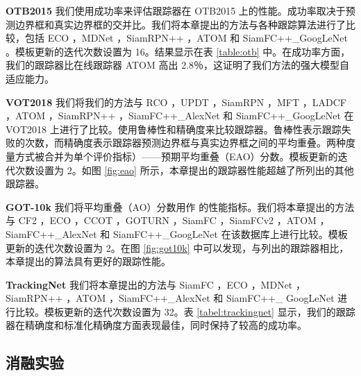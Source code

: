 \textbf{OTB2015} 我们使用成功率来评估跟踪器在 OTB2015 上的性能。成功率取决于预测边界框和真实边界框的交并比。我们将本章提出的方法与各种跟踪算法进行了比较，包括 ECO \cite{danelljan2017eco}，MDNet \cite{MDNet}，SiamRPN++ \cite{SiamRPN++}，ATOM \cite{danelljan2019atom} 和 SiamFC++\_GoogLeNet \cite{SiamFC++}。模板更新的迭代次数设置为 16。结果显示在表 \ref{table:otb} 中。在成功率方面，我们的跟踪器比在线跟踪器 ATOM 高出 2.8％，这证明了我们方法的强大模型自适应能力。

\textbf{VOT2018} 我们将我们的方法与 RCO \cite{kristan2018sixth}，UPDT \cite{bhat2018unveiling}，SiamRPN \cite{SiamRPN}，MFT \cite{kristan2018sixth}，LADCF \cite{kristan2018sixth}，ATOM \cite{danelljan2019atom}，SiamRPN++ \cite{SiamRPN++}，SiamFC++\_AlexNet \cite{SiamFC++} 和 SiamFC++\_GoogLeNet \cite{SiamFC++} 在 VOT2018 上进行了比较。使用鲁棒性和精确度来比较跟踪器。鲁棒性表示跟踪失败的次数，而精确度表示跟踪器预测边界框与真实边界框之间的平均重叠。两种度量方式被合并为单个评价指标）——预期平均重叠（EAO）分数。模板更新的迭代次数设置为 2。如图 \ref{fig:eao} 所示，本章提出的跟踪器性能超越了所列出的其他跟踪器。

\textbf{GOT-10k} 我们将平均重叠（AO）分数用作 \cite{GOT-10k} 的性能指标。我们将本章提出的方法与 CF2 \cite{CF2}，ECO \cite{danelljan2017eco}，CCOT \cite{CCOT}，GOTURN \cite{GOTURN}，SiamFC \cite{SiamFC}，SiamFCv2 \cite{valmadre2017end}，ATOM \cite{danelljan2019atom}，SiamFC++\_AlexNet \cite{SiamFC++} 和 SiamFC++\_GoogLeNet \cite{SiamFC++} 在该数据库上进行比较。模板更新的迭代次数设置为 2。在图 \ref{fig:got10k} 中可以发现，与列出的跟踪器相比，本章提出的算法具有更好的跟踪性能。

\textbf{TrackingNet} 我们将本章提出的方法与 SiamFC \cite{SiamFC}，ECO \cite{danelljan2017eco}，MDNet \cite{MDNet}，SiamRPN++ \cite{SiamRPN++}，ATOM \cite{danelljan2019atom}，SiamFC++\_AlexNet \cite{SiamFC++} 和 SiamFC++\_
GoogLeNet \cite{SiamFC++} 进行比较。模板更新的迭代次数设置为 32。表 \ref{tabel:trackingnet} 显示，我们的跟踪器在精确度和标准化精确度方面表现最佳，同时保持了较高的成功率。

\subsection{消融实验}

